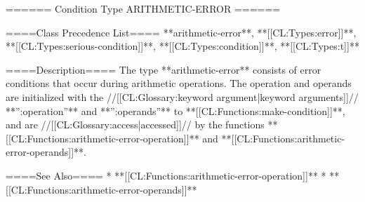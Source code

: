 ====== Condition Type ARITHMETIC-ERROR ======

====Class Precedence List==== 
**arithmetic-error**, **[[CL:Types:error]]**, **[[CL:Types:serious-condition]]**, **[[CL:Types:condition]]**, **[[CL:Types:t]]**

====Description====
The type **arithmetic-error** consists of error conditions that occur during arithmetic operations. The operation and operands are initialized with the //[[CL:Glossary:keyword argument|keyword arguments]]// **'':operation''** and **'':operands''** to **[[CL:Functions:make-condition]]**, and are //[[CL:Glossary:access|accessed]]// by the functions **[[CL:Functions:arithmetic-error-operation]]** and **[[CL:Functions:arithmetic-error-operands]]**.

====See Also====
  * **[[CL:Functions:arithmetic-error-operation]]**
  * **[[CL:Functions:arithmetic-error-operands]]**

